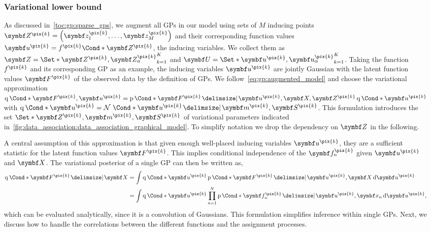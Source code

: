 \subsubsection{Variational lower bound}
As discussed in~\cref{toc:gp:sparse_gps}, we augment all GPs in our model using sets of $M$ inducing points $\mat{Z}^{\pix{k}} = \left(\mat{z}_1^{\pix{k}}, \ldots, \mat{z}_M^{\pix{k}}\right)$ and their corresponding function values $\mat{u}^{\pix{k}} = \Fun*{f^{\pix{k}}}{\mat{Z}^{\pix{k}}}$, the inducing variables.
We collect them as $\mat{Z} = \Set*{\mat{Z}^{\pix{k}}, \mat{Z}_\alpha^{\pix{k}}}_{k=1}^K$ and $\mat{U} = \Set*{\mat{u}^{\pix{k}}, \mat{u}_\alpha^{\pix{k}}}_{k=1}^K$.
Taking the function $f^{\pix{k}}$ and its corresponding GP as an example, the inducing variables $\mat{u}^{\pix{k}}$ are jointly Gaussian with the latent function values $\mat{F}^{\pix{k}}$ of the observed data by the definition of GPs.
We follow~\cref{eq:gp:augmented_model} and choose the variational approximation $\Variat*{\mat{F}^{\pix{k}}, \mat{u}^{\pix{k}}} = \Prob*{\mat{F}^{\pix{k}} \given \mat{u}^{\pix{k}}, \mat{X}, \mat{Z}^{\pix{k}}}\Variat*{\mat{u}^{\pix{k}}}$ with $\Variat*{\mat{u}^{\pix{k}}} = \Gaussian*{\mat{u}^{\pix{k}} \given \mat{m}^{\pix{k}}, \mat{S}^{\pix{k}}}$.
This formulation introduces the set $\Set*{\mat{Z}^{\pix{k}}, \mat{m}^{\pix{k}}, \mat{S}^{\pix{k}}}$ of variational parameters indicated in~\cref{fig:data_association:data_association_graphical_model}.
To simplify notation we drop the dependency on $\mat{Z}$ in the following.

A central assumption of this approximation is that given enough well-placed inducing variables $\mat{u}^{\pix{k}}$, they are a sufficient statistic for the latent function values $\mat{F}^{\pix{k}}$.
This implies conditional independence of the $\mat{f}_n^{\pix{k}}$ given $\mat{u}^{\pix{k}}$ and $\mat{X}$.
The variational posterior of a single GP can then be written as,
\begin{align}
    \begin{split}
        \Variat*{\mat{F}^{\pix{k}} \given \mat{X}}
        &=
        \int \Variat*{\mat{u}^{\pix{k}}}
        \Prob*{\mat{F}^{\pix{k}} \given \mat{u}^{\pix{k}}, \mat{X}}
        \diff \mat{u}^{\pix{k}}
        \\
        &=
        \int \Variat*{\mat{u}^{\pix{k}}}
        \prod_{n=1}^N \Prob*{\mat{f}_n^{\pix{k}} \given \mat{u}^{\pix{k}}, \mat{x}_n}
        \diff \mat{u}^{\pix{k}},
    \end{split}
\end{align}
which can be evaluated analytically, since it is a convolution of Gaussians.
This formulation simplifies inference within single GPs.
Next, we discuss how to handle the correlations between the different functions and the assignment processes.

